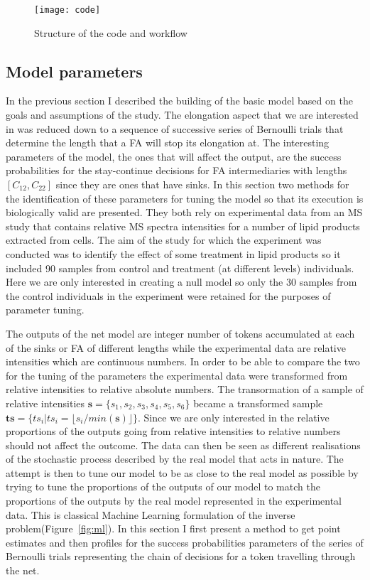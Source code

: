 \begin{figure}[htbp!]
\centering
\texttt{[image: code]}
\caption[Workflow]{Structure of the code and workflow}
\label{fig:code}
\end{figure}


\subsection{Model parameters}
In the previous section I described the building of the basic model
based on the goals and assumptions of the study. The elongation aspect
that we are interested in was reduced down to a sequence of successive
series of Bernoulli trials that determine the length that a FA will
stop its elongation at. The interesting parameters of the model, the
ones that will affect the output, are the success probabilities for
the stay-continue decisions for FA intermediaries with lengths
$[C_{12}, C_{22}]$ since they are ones that have sinks. In this
section two methods for the identification of these parameters for
tuning the model so that its execution is biologically valid are
presented. They both rely on experimental data from an MS study that
contains relative MS spectra intensities for a number of lipid
products extracted from cells. The aim of the study for which the
experiment was conducted was to identify the effect of some treatment
in lipid products so it included 90 samples from control and treatment
(at different levels) individuals. Here we are only interested in creating a null
model so only the 30 samples from the control individuals in the
experiment were retained for
the purposes of parameter tuning.

The outputs of the net model are integer number of tokens accumulated
at each of the sinks or FA of different lengths while the experimental
data are relative intensities which are continuous numbers. In order
to be able to compare the two for the tuning of the parameters the
experimental data were transformed from relative intensities to
relative absolute numbers. The transormation of a sample of relative
intensities $\mathbf{s} = \{s_1, s_2, s_3, s_4, s_5, s_6\}$ became a
transformed sample $\mathbf{ts} = \{ ts_i | ts_i = \lfloor s_i /
min(\mathbf{s}) \rfloor \}$.
 Since we are only interested in the
relative proportions of the outputs going from relative intensities to
relative numbers should not affect the outcome. The data can then be
seen as different realisations of the stochastic process described by
the real model that acts in nature. The attempt is then to tune our
model to be as close to the real model as possible by trying to tune
the proportions of the outputs of our model to match the proportions
of the outputs by the real model represented in the experimental
data. This is  classical Machine Learning formulation of the inverse
problem(Figure~\ref{fig:ml}). In this section I first present a method to get point
estimates and then profiles for the success probabilities parameters of the series of Bernoulli
trials representing the chain of decisions for a token travelling
through the net.

